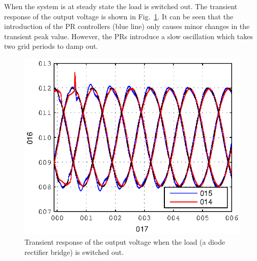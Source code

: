 \documentclass[conference,10pt]{IEEEtran}
\begin{document}
When the system is at steady state the load is switched out. The transient response of the output voltage is shown in Fig.~\ref{fig:trans_vc}. It can be seen that the introduction of the PR controllers (blue line) only causes minor changes in the transient peak value. However, the PRs introduce a slow oscillation which takes two grid periods to damp out.
\begin{figure}[!h]
\centering

\includegraphics{fig/transient_vCf}
\caption{Transient response of the output voltage when the load (a diode rectifier bridge) is switched out.}
\label{fig:trans_vc}
\end{figure}
\end{document}
